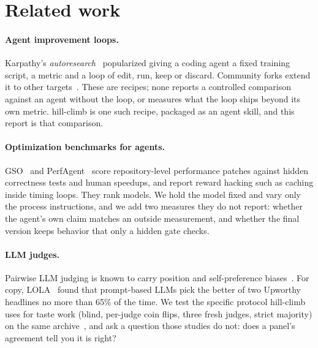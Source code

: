\section{Related work}
\label{sec:related}

\paragraph{Agent improvement loops.} Karpathy's \emph{autoresearch}~\cite{autoresearch} popularized giving a
coding agent a fixed training script, a metric and a loop of edit, run, keep or discard. Community forks extend
it to other targets~\cite{uditgoenka,tbelbek}. These are recipes; none reports a controlled comparison against an
agent without the loop, or measures what the loop ships beyond its own metric. hill-climb is one such recipe,
packaged as an agent skill, and this report is that comparison.

\paragraph{Optimization benchmarks for agents.} GSO~\cite{gso} and PerfAgent~\cite{perfagent} score repository-level
performance patches against hidden correctness tests and human speedups, and report reward hacking such as caching
inside timing loops. They rank models. We hold the model fixed and vary only the process instructions, and we add
two measures they do not report: whether the agent's own claim matches an outside measurement, and whether the
final version keeps behavior that only a hidden gate checks.

\paragraph{LLM judges.} Pairwise LLM judging is known to carry position and self-preference biases~\cite{mtbench}.
For copy, LOLA~\cite{lola} found that prompt-based LLMs pick the better of two Upworthy headlines no more than
65\% of the time. We test the specific protocol hill-climb uses for taste work (blind, per-judge coin flips,
three fresh judges, strict majority) on the same archive~\cite{upworthy}, and ask a question those studies do not:
does a panel's agreement tell you it is right?
